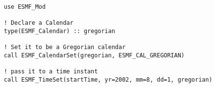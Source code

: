 
\begin{verbatim}
use ESMF_Mod

! Declare a Calendar
type(ESMF_Calendar) :: gregorian

! Set it to be a Gregorian calendar
call ESMF_CalendarSet(gregorian, ESMF_CAL_GREGORIAN)

! pass it to a time instant
call ESMF_TimeSet(startTime, yr=2002, mm=8, dd=1, gregorian)
\end{verbatim}
